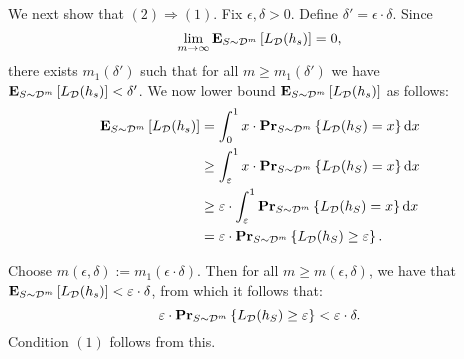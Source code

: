We next show that $(2) \Rightarrow (1)$. Fix $\epsilon, \delta > 0$. Define
$\delta' = \epsilon \cdot \delta$. Since
$$\lim_{m \to \infty} \mathbf{E}_{S \sim \mathcal{D}^m} \left [ L_{\mathcal{D}}(h_s) \right ] = 0,$$
there exists $m_1(\delta')$ such that for all $m
\geq m_1(\delta')$ we have $\mathbf{E}_{S \sim \mathcal{D}^m} \left [ L_{\mathcal{D}}(h_s) \right ] < \delta'$.
We now lower bound $\mathbf{E}_{S \sim \mathcal{D}^m} \left [ L_{\mathcal{D}}(h_s) \right ]$ as follows:
\begin{align*}
\mathbf{E}_{S \sim \mathcal{D}^m} \left [ L_{\mathcal{D}}(h_s) \right ]
& = \int_{0}^{1} x \cdot  \mathbf{Pr}_{S \sim \mathcal{D}^{m}} \left \{ L_{\mathcal{D}} (h_S) = x \right \} \text{d} x \\
& \geq \int_{\varepsilon}^1 x \cdot  \mathbf{Pr}_{S \sim \mathcal{D}^{m}} \left \{ L_{\mathcal{D}} (h_S) = x \right \} \text{d} x \\
& \geq \varepsilon \cdot \int_{\varepsilon}^1 \mathbf{Pr}_{S \sim \mathcal{D}^{m}} \left \{ L_{\mathcal{D}} (h_S) = x \right \} \text{d} x \\
& = \varepsilon \cdot  \mathbf{Pr}_{S \sim \mathcal{D}^{m}} \left \{ L_{\mathcal{D}} (h_S) \geq \varepsilon \right \}.
\end{align*}

Choose $m(\epsilon, \delta) := m_1(\epsilon \cdot \delta)$. Then for all $m
\geq m(\epsilon, \delta)$, we have that $\mathbf{E}_{S \sim
\mathcal{D}^m} \left [ L_{\mathcal{D}}(h_s) \right ] < \varepsilon \cdot \delta$, from which it follows that:
\[
    \varepsilon \cdot  \mathbf{Pr}_{S \sim \mathcal{D}^{m}} \left \{ L_{\mathcal{D}} (h_S) \geq \varepsilon \right \} <
        \varepsilon \cdot \delta. \]
Condition $(1)$ follows from this.
